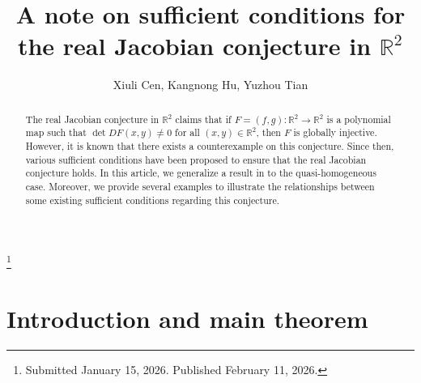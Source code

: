 \documentclass[reqno]{amsart}
\begin{document}
\title[\hfilneg EJDE-2026/12\hfil Real Jacobian conjecture]
{A note on sufficient conditions for the real Jacobian conjecture in $\mathbb{R}^2$}


\author[X. Cen, K. Hu, Y. Tian \hfil EJDE-2026/12\hfilneg]
{Xiuli Cen, Kangnong Hu, Yuzhou Tian}

\address{Xiuli Cen \newline
School of Mathematics and Statistics,
HNP-LAMA, Central South University,
Changsha, Hunan 410083, China}

\address{Kangnong Hu \newline
School of Mathematics and Statistics,
HNP-LAMA, Central South University,
Changsha, Hunan 410083, China}

\address{Yuzhou Tian \newline
Department of Mathematics,
Jinan University,
Guangzhou, Guangdong 510632, China}

\thanks{Submitted January 15, 2026. Published February 11, 2026.}

\begin{abstract}
The real Jacobian conjecture in $\mathbb{R}^2$ claims that if
$F=(f,g):\mathbb{R}^2 \to \mathbb{R}^2$ is a polynomial map such that
 $ \det DF(x,y)\neq 0 $ for all $(x,y)\in \mathbb{R}^2$, then $F$ is globally
injective. However, it is known that there exists a counterexample on this conjecture.
Since then, various sufficient conditions have been proposed to ensure that the real
Jacobian conjecture holds. In this article, we generalize a result in \cite{bib 25}
to the quasi-homogeneous case. Moreover, we provide several examples to illustrate
the relationships between some existing sufficient conditions regarding this
conjecture.
\end{abstract}

\maketitle
{}
\newtheorem{theorem}{Theorem}[section]
\newtheorem{lemma}[theorem]{Lemma}
\newtheorem{corollary}[theorem]{Corollary}
\newtheorem{example}[theorem]{Example}
\allowdisplaybreaks

\section{Introduction and main theorem}
\end{document}
